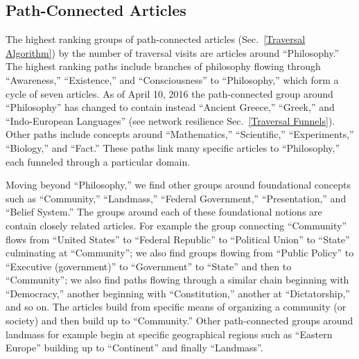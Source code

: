 \documentclass[pre,twocolumn,twoside,superscriptaddress,floatfix]{revtex4-1}
\begin{document}
{\subsection{Path-Connected Articles}

The highest ranking groups of path-connected articles (Sec.~\ref{Traversal Algorithm}) by the number of traversal visits are articles around ``Philosophy.'' 
The highest ranking paths include branches of philosophy flowing through 
``Awareness,'' ``Existence,'' and ``Consciousness'' to ``Philosophy,'' 
which form a cycle of seven articles. As of April 10, 2016 the path-connected group around
``Philosophy'' has changed to contain instead ``Ancient Greece,'' ``Greek,'' and 
``Indo-European Languages'' (see network resilience Sec.~\ref{Traversal Funnels}).
Other paths
include concepts around ``Mathematics,'' ``Scientific,'' ``Experiments,'' 
``Biology,'' and ``Fact.''
These paths link many specific articles to ``Philosophy,'' each funneled through a particular domain.

Moving beyond ``Philosophy,'' we find other groups around 
foundational concepts such as ``Community,'' ``Landmass,'' ``Federal Government,'' 
``Presentation,'' and ``Belief System.'' 
The groups around each of these foundational notions are 
contain closely related articles. For example the group connecting
``Community''
flows from ``United States'' to ``Federal Republic'' to ``Political Union'' to ``State'' culminating at ``Community''; we also find groups flowing from 
``Public Policy'' to ``Executive (government)'' to ``Government'' to ``State'' and then 
to ``Community''; we also find paths flowing through a similar chain beginning
with ``Democracy,'' another beginning with ``Constitution,'' another at 
``Dictatorship,'' and so on. The articles build from specific means of organizing
a community (or society) and then build up to ``Community.'' 
Other path-connected groups around landmass for example begin at specific geographical regions
such as ``Eastern Europe'' building up to ``Continent'' and finally ``Landmass''.

}
\end{document}
